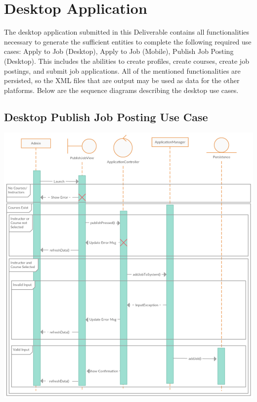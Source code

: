 \documentclass[12pt]{report}
\begin{document}
\section{Desktop Application}
The desktop application submitted in this Deliverable contains all functionalities necessary to
generate the sufficient entities to complete the following required use cases: Apply to Job
(Desktop), Apply to Job (Mobile), Publish Job Posting (Desktop). This includes the abilities to
create profiles, create courses, create job postings, and submit job applications. All of the
mentioned functionalities are persisted, so the XML files that are output may be used as data for
the other platforms. Below are the sequence diagrams describing the desktop use cases.
\subsection{Desktop Publish Job Posting Use Case}
\includegraphics[scale=0.73]{model/SEQUENCE/publish_desktopSequenceAlt}
\end{document}
